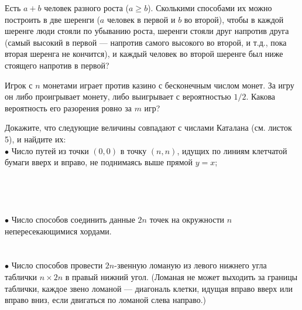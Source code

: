 \documentclass[11pt,a4paper]{article}
\begin{document}
 Есть $a+b$ человек разного роста ($a\geq b$). Сколькими способами их можно построить в две шеренги ($a$ человек в первой и $b$ во второй), чтобы в каждой шеренге люди стояли по убыванию роста, шеренги стояли друг напротив друга (самый высокий в первой --- напротив самого высокого во второй, и т.д., пока вторая шеренга не кончится), и каждый человек во второй шеренге был ниже стоящего напротив в первой?




 Игрок с $n$ монетами играет против казино с
бесконечным числом монет. За игру он либо проигрывает монету,
либо выигрывает с вероятностью $1/2$. %
Какова вероятность его разорения ровно за $m$ игр?


Докажите, что следующие величины совпадают с числами Каталана (см. листок 5), и найдите их:\\
$\bullet$ Число путей из точки $(0,0)$ в точку $(n,n)$, идущих по линиям
клетчатой бумаги вверх и вправо, не поднимаясь
выше прямой $y=x$;\\ \\ \\ \\ \\
\vspace*{1cm}
$\bullet$ Число способов соединить данные $2n$ точек на окружности $n$ непересекающимися хордами.\\ \\ \\
$\bullet$
Число способов провести $2n$-звенную ломаную из
левого нижнего угла таблички $n\times2n$ в правый нижний угол.
(Ломаная не может выходить за границы таблички, каждое звено
ломаной --- диагональ клетки, идущая вправо вверх или вправо вниз,
если двигаться по ломаной слева направо.)
\end{document}
